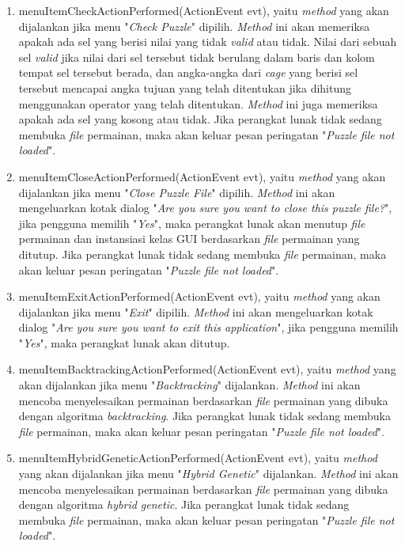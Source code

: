 \begin{enumerate}
\item menuItemCheckActionPerformed(ActionEvent evt), yaitu \textit{method} yang akan dijalankan jika menu "\textit{Check Puzzle}" dipilih. \textit{Method} ini akan memeriksa apakah ada sel yang berisi nilai yang tidak \textit{valid} atau tidak. Nilai dari sebuah sel \textit{valid} jika nilai dari sel tersebut tidak berulang dalam baris dan kolom tempat sel tersebut berada, dan angka-angka dari \textit{cage} yang berisi sel tersebut mencapai angka tujuan yang telah ditentukan jika dihitung menggunakan operator yang telah ditentukan. \textit{Method} ini juga memeriksa apakah ada sel yang kosong atau tidak. Jika perangkat lunak tidak sedang membuka \textit{file} permainan, maka akan keluar pesan peringatan "\textit{Puzzle file not loaded}".
\item menuItemCloseActionPerformed(ActionEvent evt), yaitu \textit{method} yang akan dijalankan jika menu "\textit{Close Puzzle File}" dipilih. \textit{Method} ini akan mengeluarkan kotak dialog "\textit{Are you sure you want to close this puzzle file?}", jika pengguna memilih "\textit{Yes}", maka perangkat lunak akan menutup \textit{file} permainan dan instansiasi kelas GUI berdasarkan \textit{file} permainan yang ditutup. Jika perangkat lunak tidak sedang membuka \textit{file} permainan, maka akan keluar pesan peringatan "\textit{Puzzle file not loaded}".
\item menuItemExitActionPerformed(ActionEvent evt), yaitu \textit{method} yang akan dijalankan jika menu "\textit{Exit}" dipilih. \textit{Method} ini akan mengeluarkan kotak dialog "\textit{Are you sure you want to exit this application}", jika pengguna memilih "\textit{Yes}", maka perangkat lunak akan ditutup.
\item menuItemBacktrackingActionPerformed(ActionEvent evt), yaitu \textit{method} yang akan dijalankan jika menu "\textit{Backtracking}" dijalankan. \textit{Method} ini akan mencoba menyelesaikan permainan berdasarkan \textit{file} permainan yang dibuka dengan algoritma \textit{backtracking}. Jika perangkat lunak tidak sedang membuka \textit{file} permainan, maka akan keluar pesan peringatan "\textit{Puzzle file not loaded}".
\item menuItemHybridGeneticActionPerformed(ActionEvent evt), yaitu \textit{method} yang akan dijalankan jika menu "\textit{Hybrid Genetic}" dijalankan. \textit{Method} ini akan mencoba menyelesaikan permainan berdasarkan \textit{file} permainan yang dibuka dengan algoritma \textit{hybrid genetic}. Jika perangkat lunak tidak sedang membuka \textit{file} permainan, maka akan keluar pesan peringatan "\textit{Puzzle file not loaded}".

\end{enumerate}
